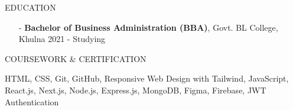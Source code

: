 \documentclass{resume} %
\begin{document}

\begin{rSection}{EDUCATION}

\begin{itemize}
    \item[-] {\bf Bachelor of Business Administration (BBA)}, Govt. BL College, Khulna \hfill {2021 - Studying}
\end{itemize}

\end{rSection}


\begin{rSection}{COURSEWORK \& CERTIFICATION}

{HTML, CSS, Git, GitHub, Responsive Web Design with Tailwind, JavaScript, React.js, Next.js, Node.js, Express.js, MongoDB, Figma, Firebase, JWT Authentication}

\end{rSection}
\end{document}
